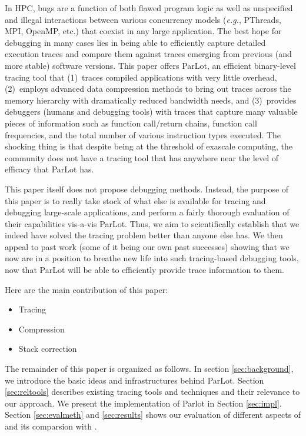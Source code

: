 In HPC, bugs are a function of both flawed program logic as well as unspecified
and illegal interactions between various concurrency models ({\em e.g.}, PThreads,
MPI, OpenMP, etc.) that coexist in any
large application.
%
The best hope for debugging in many cases
lies in being able to efficiently capture detailed execution
traces and compare them against traces emerging from previous (and more stable) 
software versions.
%
This paper offers ParLot, an efficient binary-level tracing tool that 
(1)~traces compiled applications with very little overhead, (2)~employs
advanced data compression methods to bring out traces across the memory
hierarchy with dramatically reduced bandwidth needs, and (3)~provides debuggers
(humans and debugging tools) with traces that capture many valuable pieces of
information such as function call/return chains, function call frequencies, and
the total number of various instruction types executed.
%
The shocking thing is that despite being at the threshold of exascale computing,
the community does not have a tracing tool that has anywhere near the level
of efficacy that ParLot has.


This paper itself does not propose debugging methods.
%
Instead, the purpose of this paper is to really take stock of what else is
available for tracing and debugging large-scale applications, and perform 
a fairly thorough evaluation of their capabilities vis-a-vis ParLot.
%
Thus, we aim to scientifically establish that we indeed have solved the
tracing problem better than anyone else has.
%
We then appeal to past work (some of it being our own past successes) showing that we now are in
a position to breathe new life into such tracing-based debugging tools, now that
ParLot will be able to efficiently provide trace information to them.

Here are the main contribution of this paper:
\begin{itemize}
\item Tracing
\item Compression
\item Stack correction
\end{itemize}

The remainder of this paper is organized as follows. In section
\ref{sec:background}, we introduce the basic ideas and infrastructures behind ParLot. Section \ref{sec:reltools} describes existing tracing tools and techniques and their relevance
to our approach. We present the implementation of Parlot in Section \ref{sec:impl}. Section \ref{sec:evalmeth} and \ref{sec:results} shows our evaluation of different aspects of \parlot and its comparsion with \callgrind.
